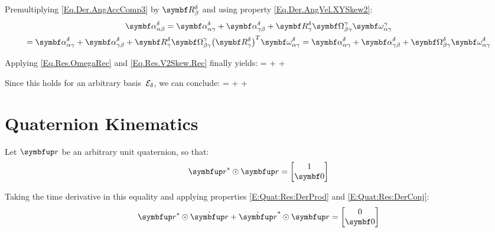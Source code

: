 Premultiplying \eqref{Eq.Der.AngAccComp3} by $\RotM{\delta}{\beta}$ and using property \eqref{Eq.Der.AngVel.XYSkew2}:
\begin{multline*}
\angacc{\alpha}{\beta}{\delta} =\angacc{\alpha}{\gamma}{\delta}  + \angacc{\gamma}{\beta}{\delta} + \RotM{\delta}{\gamma} \AngVelSkew{\beta}{\gamma}{\gamma} \angvel{\alpha}{\gamma}{\gamma} \\
=\angacc{\alpha}{\gamma}{\delta}  + \angacc{\gamma}{\beta}{\delta} + \RotM{\delta}{\gamma} \AngVelSkew{\beta}{\gamma}{\gamma} \trp{\RotM{\delta}{\gamma}} \angvel{\alpha}{\gamma}{\delta}
=\angacc{\alpha}{\gamma}{\delta}  + \angacc{\gamma}{\beta}{\delta} + \AngVelSkew{\beta}{\gamma}{\delta}  \angvel{\alpha}{\gamma}{\delta}
\end{multline*}

Applying \eqref{Eq.Res.OmegaRec} and \eqref{Eq.Res.V2Skew.Rec} finally yields:
{
\angacc{\alpha}{\beta}{\delta} =\angacc{\alpha}{\gamma}{\delta}  + \angacc{\gamma}{\beta}{\delta} + \AngVelSkew{\alpha}{\gamma}{\delta} \angvel{\gamma}{\beta}{\delta}
}

Since this holds for an arbitrary basis~$\basis[\delta]$, we can conclude:
{
\varel{\angaccsymb}{\alpha}{\beta} = \varel{\angaccsymb}{\alpha}{\gamma} + \varel{\angaccsymb}{\gamma}{\beta} + \varel{\angvelsymb}{\alpha}{\gamma} \times \varel{\angvelsymb}{\gamma}{\beta}
}



\section{Quaternion Kinematics}
Let $\quat{\rotq}$ be an arbitrary unit quaternion, so that:
\begin{equation*}
\qcon{\quat{\rotq}} \qprod \quat{\rotq} = \qcol{1}{\mcol{0}}
\end{equation*}

Taking the time derivative in this equality and applying properties \eqref{E:Quat:Res:DerProd} and \eqref{E:Quat:Res:DerConj}:
\begin{equation} \label{E:AttKin:QuatKin:Der1}
	\qcon{\quat{\rotq}} \qprod \dot{\quat{\rotq}} + \qcon{\dot{\quat{\rotq}}} \qprod \quat{\rotq} = \qcol{0}{\mcol{0}}
\end{equation}

